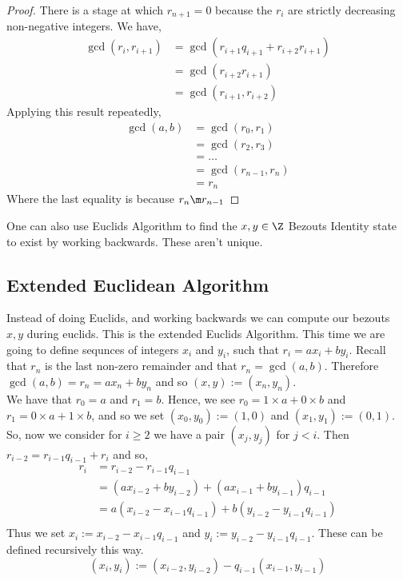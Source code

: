 \begin{proof}
  There is a stage at which $r_{n+1} = 0$ because the $r_i$ are strictly decreasing non-negative integers. We have,
  \begin{align*}
    \gcd(r_i, r_{i+1}) &= \gcd(r_{i+1}q_{i+1} + r_{i+2}r_{i+1})\\
    &= \gcd(r_{i+2}r_{i+1}) \\
    &= \gcd(r_{i+1}, r_{i+2})
  \end{align*}
  Applying this result repeatedly,
  \begin{align*}
    \gcd(a, b) &= \gcd(r_0, r_1)\\
    &= \gcd(r_2, r_3)\\
    &= \dots\\
    &= \gcd(r_{n-1}, r_n)\\
    &= r_n
  \end{align*}
  Where the last equality is because $r_n \m r_{n-1}$
\end{proof}

\begin{remark}
   One can also use Euclids Algorithm to find the $x, y\in \Z$ Bezouts Identity state to exist by working backwards. These aren't unique.
\end{remark}

\subsection{Extended Euclidean Algorithm}

Instead of doing Euclids, and working backwards we can compute our bezouts $x, y$ during euclids. This is the extended Euclids Algorithm. This time we are going to define sequnces of integers $x_i$ and $y_i$, such that $r_i = ax_i + by_i$. Recall that $r_n$ is the last non-zero remainder and that $r_n = \gcd(a, b)$. Therefore $\gcd(a, b) = r_n = ax_n + by_n$ and so $(x, y) := (x_n, y_n)$.\\

We have that $r_0 = a$ and $r_1 = b$. Hence, we see $r_0 = 1 \times a + 0 \times b$ and $r_1 = 0 \times a + 1 \times b$, and so we set $(x_0, y_0) := (1, 0)$ and $(x_1, y_1) := (0, 1)$. So, now we consider for $i \ge 2$ we have a pair $(x_j, y_j)$ for $j < i$. Then $r_{i-2} = r_{i-1}q_{i-1} + r_i$ and so,
\begin{align*}
  r_i &= r_{i-2} - r_{i-1}q_{i-1}\\
  &= (ax_{i-2} + by_{i-2}) + (ax_{i-1} + by_{i-1})q_{i-1}\\
  &= a(x_{i-2} - x_{i-1}q_{i-1}) + b(y_{i-2} - y_{i-1}q_{i-1})\\
\end{align*}
Thus we set $x_i := x_{i-2} - x_{i-1}q_{i-1}$ and $y_i := y_{i-2} - y_{i-1}q_{i-1}$. These can be defined recursively this way.
$$ (x_i, y_i) := (x_{i-2}, y_{i-2}) - q_{i-1}(x_{i-1}, y_{i-1}) $$

